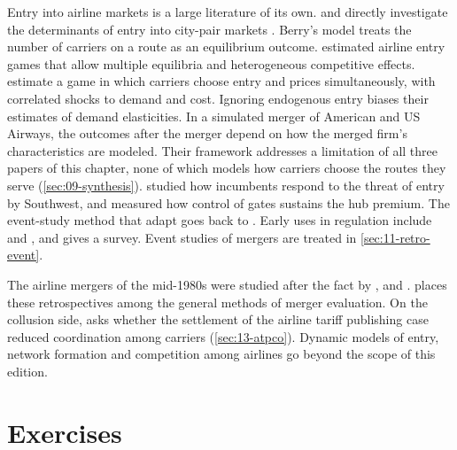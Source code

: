 Entry into airline markets is a large literature of its own. \citet{ReissSpiller1989} and \citet{Berry1992}
directly investigate the determinants of entry into city-pair markets \citep[p.~446, n.~1]{WhinstonCollins1992}.
Berry's model treats the number of carriers on a route as an equilibrium outcome.
\citet{CilibertoTamer2009} estimated airline entry games that allow multiple equilibria and heterogeneous
competitive effects. \citet{CilibertoMurryTamer2021} estimate a game in which carriers choose entry and prices
simultaneously, with correlated shocks to demand and cost. Ignoring endogenous entry biases their estimates of
demand elasticities. In a simulated merger of American and US Airways, the outcomes after the merger depend on
how the merged firm's characteristics are modeled. Their framework addresses a limitation of all three papers
of this chapter, none of which models how carriers choose the routes they serve (\cref{sec:09-synthesis}). \citet{GoolsbeeSyverson2008} studied how incumbents respond to the threat of entry by
Southwest, and \citet{CilibertoWilliams2010} measured how control of gates sustains the hub premium. The
event-study method that \citet{WhinstonCollins1992} adapt goes back to \citet{FamaEtAl1969}. Early uses in
regulation include \citet{Schwert1981} and \citet{Rose1985}, and \citet{MacKinlay1997} gives a survey. Event
studies of mergers are treated in \cref{sec:11-retro-event}.

The airline mergers of the mid-1980s were studied after the fact by \citet{Borenstein1990},
\citet{KimSingal1993} and \citet{Peters2006}.  places these retrospectives among the
general methods of merger evaluation. On the collusion side, \citet{Miller2010} asks whether the settlement
of the airline tariff publishing case reduced coordination among carriers (\cref{sec:13-atpco}). Dynamic
models of entry, network formation and competition among airlines go beyond the scope of this edition.

\section{Exercises}\label{sec:09-exercises}


